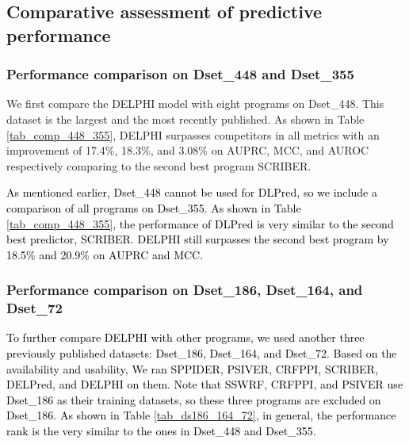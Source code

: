 \documentclass{bioinfo}
\newcommand{\myColor}{black}
\begin{document}
\subsection{Comparative assessment of predictive performance}
\subsubsection{Performance comparison on Dset\_448 and Dset\_355}
We first compare the DELPHI model with eight programs on Dset\_448. This dataset is the largest and the most recently published. As shown in Table \ref{tab_comp_448_355}, DELPHI surpasses competitors in all metrics with an improvement of 17.4\%, 18.3\%, and 3.08\% on AUPRC, MCC, and AUROC respectively comparing to the second best program SCRIBER.

\textcolor{\myColor}{As mentioned earlier, Dset\_448 cannot be used for DLPred, so we include a comparison of all programs on Dset\_355. As shown in Table \ref{tab_comp_448_355}, the performance of DLPred is very similar to the second best predictor, SCRIBER.  DELPHI still surpasses the second best program by 18.5\% and 20.9\% on AUPRC and MCC.  }

\subsubsection{Performance comparison on Dset\_186, Dset\_164, and Dset\_72}\label{section_four_tests}
\textcolor{\myColor}{To further compare DELPHI with other programs, we used another three previously published datasets: Dset\_186, Dset\_164, and Dset\_72. Based on the availability and usability, We ran SPPIDER, PSIVER, CRFPPI, SCRIBER, DELPred, and DELPHI on them. Note that SSWRF, CRFPPI, and PSIVER use Dset\_186 as their training datasets, so these three programs are excluded on Dset\_186. As shown in Table \ref{tab_ds186_164_72}, in general, the performance rank is the very similar to the ones in Dset\_448 and Dset\_355.}
\end{document}
